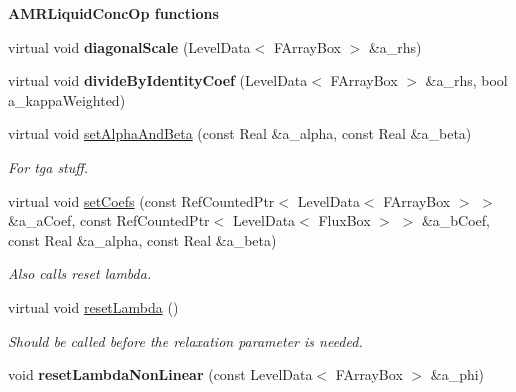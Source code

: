 \begin{Indent}{\bf A\-M\-R\-Liquid\-Conc\-Op functions}
\begin{DoxyCompactItemize}
\item 
\hypertarget{class_a_m_r_liquid_conc_op_a14f09a566d2a035ccafaa3e8f8e1d8b1}{virtual void {\bfseries diagonal\-Scale} (Level\-Data$<$ F\-Array\-Box $>$ \&a\-\_\-rhs)}\label{class_a_m_r_liquid_conc_op_a14f09a566d2a035ccafaa3e8f8e1d8b1}

\item 
\hypertarget{class_a_m_r_liquid_conc_op_a4b1459ee4204a577807a1943e7f64c1d}{virtual void {\bfseries divide\-By\-Identity\-Coef} (Level\-Data$<$ F\-Array\-Box $>$ \&a\-\_\-rhs, bool a\-\_\-kappa\-Weighted)}\label{class_a_m_r_liquid_conc_op_a4b1459ee4204a577807a1943e7f64c1d}

\item 
\hypertarget{class_a_m_r_liquid_conc_op_aa0b7a4f2936662cc798cfa0794f50a28}{virtual void \hyperlink{class_a_m_r_liquid_conc_op_aa0b7a4f2936662cc798cfa0794f50a28}{set\-Alpha\-And\-Beta} (const Real \&a\-\_\-alpha, const Real \&a\-\_\-beta)}\label{class_a_m_r_liquid_conc_op_aa0b7a4f2936662cc798cfa0794f50a28}

\begin{DoxyCompactList}\small\item\em For tga stuff. \end{DoxyCompactList}\item 
\hypertarget{class_a_m_r_liquid_conc_op_a2b9d0e159c11d00b26936a07045e1d3e}{virtual void \hyperlink{class_a_m_r_liquid_conc_op_a2b9d0e159c11d00b26936a07045e1d3e}{set\-Coefs} (const Ref\-Counted\-Ptr$<$ Level\-Data$<$ F\-Array\-Box $>$ $>$ \&a\-\_\-a\-Coef, const Ref\-Counted\-Ptr$<$ Level\-Data$<$ Flux\-Box $>$ $>$ \&a\-\_\-b\-Coef, const Real \&a\-\_\-alpha, const Real \&a\-\_\-beta)}\label{class_a_m_r_liquid_conc_op_a2b9d0e159c11d00b26936a07045e1d3e}

\begin{DoxyCompactList}\small\item\em Also calls reset lambda. \end{DoxyCompactList}\item 
\hypertarget{class_a_m_r_liquid_conc_op_a7db78d52b946b8706d83328f5f49f3e1}{virtual void \hyperlink{class_a_m_r_liquid_conc_op_a7db78d52b946b8706d83328f5f49f3e1}{reset\-Lambda} ()}\label{class_a_m_r_liquid_conc_op_a7db78d52b946b8706d83328f5f49f3e1}

\begin{DoxyCompactList}\small\item\em Should be called before the relaxation parameter is needed. \end{DoxyCompactList}\item 
\hypertarget{class_a_m_r_liquid_conc_op_affa06d4c8000c12af3285d8e7ec39a0f}{void {\bfseries reset\-Lambda\-Non\-Linear} (const Level\-Data$<$ F\-Array\-Box $>$ \&a\-\_\-phi)}\label{class_a_m_r_liquid_conc_op_affa06d4c8000c12af3285d8e7ec39a0f}


\end{DoxyCompactItemize}
\end{Indent}

